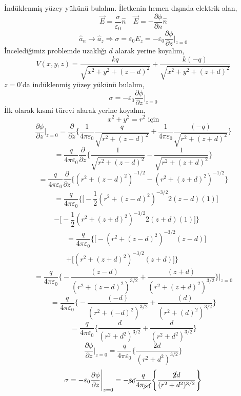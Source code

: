\begin{theorem}
İndüklenmiş yüzey yükünü bulalım. İletkenin hemen dışında elektrik alan,
\[ \Vec{E} = \dfrac{\sigma}{\varepsilon_{0}} \hat{n}  \quad \Vec{E} = - \dfrac{\partial \phi}{\partial n} \hat{n} \]
\[ \hat{a}_{n} \rightarrow \hat{a}_{z} \Rightarrow \sigma = \varepsilon_{0} E_{z} = - \varepsilon_{0} \dfrac{\partial \phi}{\partial z} \Bigg|_{z=0} \]
İncelediğimiz problemde uzaklığı $d$ alarak yerine koyalım,
\[ V (x,y,z) = \dfrac{kq}{\sqrt{x^{2} + y^{2} + (z-d)^{2}}} + \dfrac{k (-q)}{\sqrt{x^{2} + y^{2} + (z+d)^{2}}} \]
$z=0$'da indüklenmiş yüzey yükünü bulalım,
\[ \sigma = - \varepsilon_{0} \dfrac{\partial \phi}{\partial z} \Bigg|_{z=0}  \]
İlk olarak kısmi türevi alarak yerine koyalım,
\[ x^{2} + y^{2} = r^{2} \textrm{ için} \]
\[ \dfrac{\partial \phi}{\partial z} \Bigg|_{z=0} =  \dfrac{\partial}{\partial z}  \Bigg\{ \dfrac{1}{4 \pi \varepsilon_{0}} \dfrac{q}{\sqrt{r^{2} + (z-d)^{2}}} + \dfrac{1}{4 \pi \varepsilon_{0}} \dfrac{ (-q)}{\sqrt{r^{2} + (z+d)^{2}}}  \Bigg\} \]
\[ =   \dfrac{q}{4 \pi \varepsilon_{0}} \dfrac{\partial}{\partial z}  \Bigg\{ \dfrac{1}{\sqrt{r^{2} + (z-d)^{2}}} - \dfrac{1}{\sqrt{r^{2} + (z+d)^{2}}}  \Bigg\} \]
\[ = \dfrac{q}{4 \pi \varepsilon_{0}} \dfrac{\partial}{\partial z}  \Bigg\{ (r^{2} + (z-d)^{2})^{-1/2} - (r^{2} + (z+d)^{2})^{-1/2} \Bigg\} \]
\begin{align*}
&= \dfrac{q}{4 \pi \varepsilon_{0}}  \Bigg\{ \Big[ - \dfrac{1}{2} (r^{2} + (z-d)^{2})^{-3/2} 2(z-d) (1) \Big] \\
&- \Big[ - \dfrac{1}{2} (r^{2} + (z+d)^{2})^{-3/2} 2(z+d) (1) \Big]  \Bigg\}
\end{align*}
\begin{align*}
&= \dfrac{q}{4 \pi \varepsilon_{0}}  \Bigg\{ \Big[ -  (r^{2} + (z-d)^{2})^{-3/2} (z-d)  \Big] \\
& + \Big[  (r^{2} + (z+d)^{2})^{-3/2} (z+d) \Big]  \Bigg\}
\end{align*}
\[ = \dfrac{q}{4 \pi \varepsilon_{0}}  \Bigg\{ - \dfrac{(z-d)}{ (r^{2} + (z-d)^{2})^{3/2}} + \dfrac{(z+d)}{ (r^{2} + (z+d)^{2})^{3/2}}  \Bigg\} \Bigg|_{z=0} \]
\[ = \dfrac{q}{4 \pi \varepsilon_{0}}  \Bigg\{ - \dfrac{(-d)}{ (r^{2} + (-d)^{2})^{3/2}} + \dfrac{(d)}{ (r^{2} + (d)^{2})^{3/2}}  \Bigg\} \]
\[ = \dfrac{q}{4 \pi \varepsilon_{0}}  \Bigg\{  \dfrac{d}{ (r^{2} + d^{2})^{3/2}} + \dfrac{d}{ (r^{2} + d^{2})^{3/2}}  \Bigg\} \]
\[ \dfrac{\partial \phi}{\partial z} \Bigg|_{z=0}  = \dfrac{q}{4 \pi \varepsilon_{0}}  \Bigg\{  \dfrac{2 d}{ (r^{2} + d^{2})^{3/2}} \Bigg\} \]
\[ \sigma = - \varepsilon_{0} \dfrac{\partial \phi}{\partial z} \Bigg|_{z=0} = - \cancel{\varepsilon_{0}}  \dfrac{q}{4 \pi \cancel{\varepsilon_{0}}}  \Bigg\{  \dfrac{\cancel{2} d}{ (r^{2} + d^{2})^{3/2}} \Bigg\}  \]

\end{theorem}
